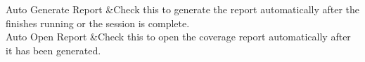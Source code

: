 \begin{longtabu}
Auto Generate Report   &Check this to generate the report automatically after the  finishes running or the  session is complete.    \\
Auto Open Report   &Check this to open the coverage report automatically after it has been generated.   \\
\end{longtabu}
